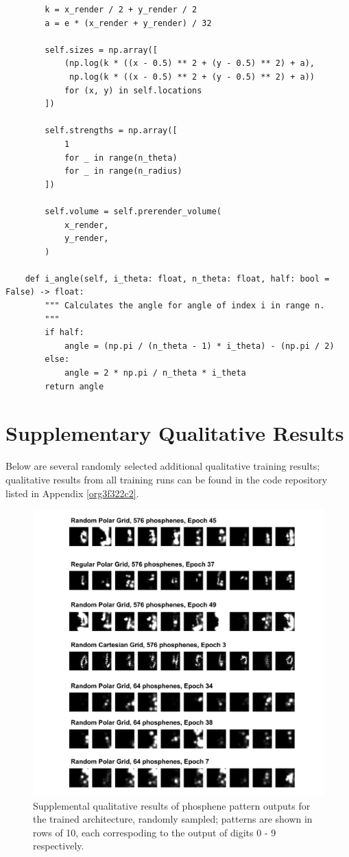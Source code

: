 \documentclass[a4paper,11pt,openany]{book}
\begin{document}
\begin{appendices}
\begin{footnotesize}
\begin{verbatim}
        k = x_render / 2 + y_render / 2
        a = e * (x_render + y_render) / 32

        self.sizes = np.array([
            (np.log(k * ((x - 0.5) ** 2 + (y - 0.5) ** 2) + a),
             np.log(k * ((x - 0.5) ** 2 + (y - 0.5) ** 2) + a))
            for (x, y) in self.locations
        ])

        self.strengths = np.array([
            1
            for _ in range(n_theta)
            for _ in range(n_radius)
        ])

        self.volume = self.prerender_volume(
            x_render,
            y_render,
        )

    def i_angle(self, i_theta: float, n_theta: float, half: bool = False) -> float:
        """ Calculates the angle for angle of index i in range n.
        """
        if half:
            angle = (np.pi / (n_theta - 1) * i_theta) - (np.pi / 2)
        else:
            angle = 2 * np.pi / n_theta * i_theta
        return angle
\end{verbatim}
\end{footnotesize}

\chapter{Supplementary Qualitative Results}
\label{sec:org9371f13}

Below are several randomly selected additional qualitative training results; qualitative results from all training runs can be found in the code repository listed in Appendix \ref{org3f322c2}.

\begin{figure}[htbp]
\centering
\includegraphics[width=.9\linewidth]{./images/example_appendix.png}
\caption[Supplemental qualitative results.]{\label{fig:orgd500b1b}
Supplemental qualitative results of phosphene pattern outputs for the trained architecture, randomly sampled; patterns are shown in rows of 10, each correspoding to the output of digits 0 - 9 respectively.}
\end{figure}


\end{appendices}
\end{document}
